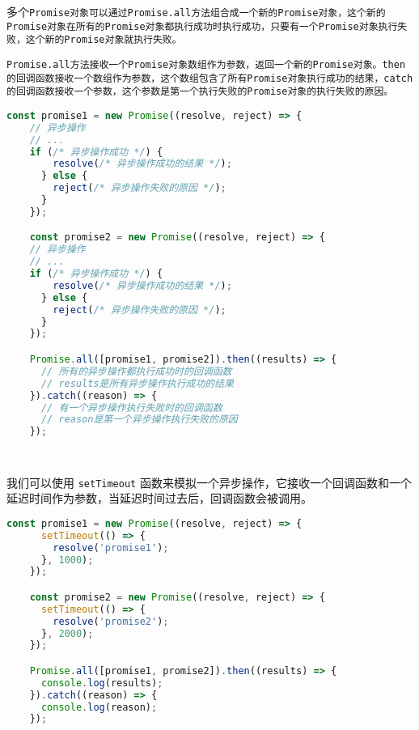 \documentclass{beamer}
\begin{document}
\begin{frame}
  \framebreak

  多个\tt{Promise}对象可以通过\tt{Promise.all}方法组合成一个新的\tt{Promise}对象，这个新的\tt{Promise}对象在所有的\tt{Promise}对象都执行成功时执行成功，只要有一个\tt{Promise}对象执行失败，这个新的\tt{Promise}对象就执行失败。



  \vspace{1em}

  \tt{Promise.all}方法接收一个\tt{Promise}对象数组作为参数，返回一个新的\tt{Promise}对象。\texttt{then}的回调函数接收一个数组作为参数，这个数组包含了所有\tt{Promise}对象执行成功的结果，\texttt{catch}的回调函数接收一个参数，这个参数是第一个执行失败的\tt{Promise}对象的执行失败的原因。

  \begin{lstlisting}[language=JavaScript]
    const promise1 = new Promise((resolve, reject) => {
    // 异步操作
    // ...
    if (/* 异步操作成功 */) {
        resolve(/* 异步操作成功的结果 */);
      } else {
        reject(/* 异步操作失败的原因 */);
      }
    });

    const promise2 = new Promise((resolve, reject) => {
    // 异步操作
    // ...
    if (/* 异步操作成功 */) {
        resolve(/* 异步操作成功的结果 */);
      } else {
        reject(/* 异步操作失败的原因 */);
      }
    });

    Promise.all([promise1, promise2]).then((results) => {
      // 所有的异步操作都执行成功时的回调函数
      // results是所有异步操作执行成功的结果
    }).catch((reason) => {
      // 有一个异步操作执行失败时的回调函数
      // reason是第一个异步操作执行失败的原因
    });

  
\end{lstlisting}
  \framebreak
  我们可以使用 \texttt{setTimeout} 函数来模拟一个异步操作，它接收一个回调函数和一个延迟时间作为参数，当延迟时间过去后，回调函数会被调用。

  \begin{lstlisting}[language=JavaScript]
    const promise1 = new Promise((resolve, reject) => {
      setTimeout(() => {
        resolve('promise1');
      }, 1000);
    });

    const promise2 = new Promise((resolve, reject) => {
      setTimeout(() => {
        resolve('promise2');
      }, 2000);
    });

    Promise.all([promise1, promise2]).then((results) => {
      console.log(results);
    }).catch((reason) => {
      console.log(reason);
    });
\end{lstlisting}


\end{frame}
\end{document}
